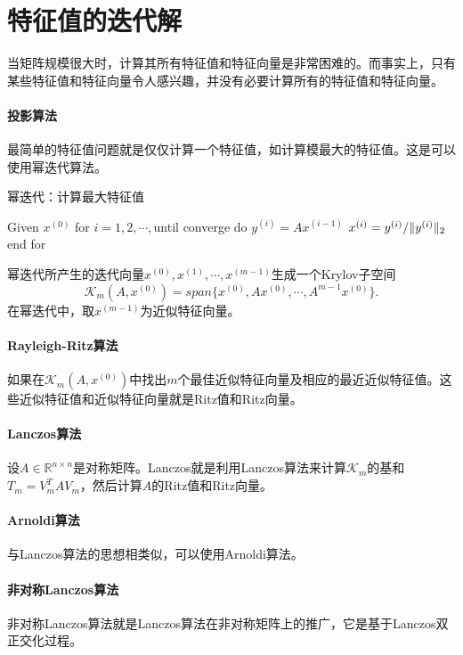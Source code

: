 \documentclass[UTF8]{article}
\begin{document}
\section{特征值的迭代解}
\begin{flushleft}
当矩阵规模很大时，计算其所有特征值和特征向量是非常困难的。而事实上，\textcolor[rgb]{0.00,0.07,1.00}{只有某些特征值和特征向量令人感兴趣}，并没有必要计算所有的特征值和特征向量。

\paragraph{投影算法}
最简单的特征值问题就是仅仅计算一个特征值，如计算模最大的特征值。这是可以使用幂迭代算法。
\begin{algorithm}[H]
\caption{幂迭代：计算最大特征值}
\begin{algorithmic}[1]
  \State Given $x^{(0)}$
  \State for $i=1,2,\cdots,$until converge do
  \State \qquad $y^{(i)}=Ax^{(i-1)}$
  \State \qquad $x^{(i)}=y^{(i)}/\Arrowvert y^{(i)} \Arrowvert _2$
  \State end for
\end{algorithmic}
\end{algorithm}
幂迭代所产生的迭代向量$x^{(0)},x^{(1)},\cdots,x^{(m-1)}$生成一个Krylov子空间
$$\mathcal{K}_m(A,x^{(0)})=span\{x^{(0)},Ax^{(0)},\cdots,A^{m-1}x^{(0)}\}.$$
在幂迭代中，取$x^{(m-1)}$为近似特征向量。

\paragraph{Rayleigh-Ritz算法}
如果在$\mathcal{K}_m(A,x^{(0)})$中找出$m$个最佳近似特征向量及相应的最近近似特征值。这些近似特征值和近似特征向量就是\textcolor[rgb]{0.00,0.07,1.00}{Ritz值}和\textcolor[rgb]{0.00,0.07,1.00}{Ritz向量}。

\paragraph{Lanczos算法}
设$A\in\mathbb{R}^{n \times n}$是对称矩阵。Lanczos就是利用Lanczos算法来计算$\mathcal{K}_m$的基和$T_m=V_m^TAV_m$，然后计算$A$的Ritz值和Ritz向量。

\paragraph{Arnoldi算法}
与Lanczos算法的思想相类似，可以使用Arnoldi算法。

\paragraph{非对称Lanczos算法}
非对称Lanczos算法就是Lanczos算法在非对称矩阵上的推广，它是基于Lanczos双正交化过程。
\end{flushleft}
\end{document}
